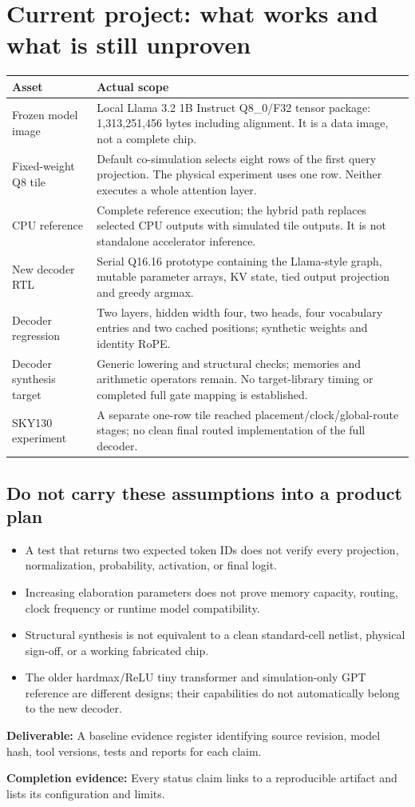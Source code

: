 \documentclass[11pt,a4paper]{article}
\newcommand{\phase}[2]{\clearpage\section{#1}\label{#2}}
\newcommand{\deliver}[2]{\begin{tcolorbox}[colback=pale,colframe=line,boxrule=0.5pt,arc=1mm,left=8pt,right=8pt,top=6pt,bottom=6pt]\textbf{Deliverable:} #1\par\textbf{Completion evidence:} #2\end{tcolorbox}}
\begin{document}
\clearpage
\begingroup
\small
\setlength{\parskip}{0pt}
\tableofcontents
\endgroup

\phase{Current project: what works and what is still unproven}{sec:status}
\begin{tabularx}{\linewidth}{@{}p{42mm}Y@{}}
\toprule\textbf{Asset} & \textbf{Actual scope}\\\midrule
Frozen model image & Local Llama 3.2 1B Instruct Q8\_0/F32 tensor package: 1,313,251,456 bytes including alignment. It is a data image, not a complete chip.\\
Fixed-weight Q8 tile & Default co-simulation selects eight rows of the first query projection. The physical experiment uses one row. Neither executes a whole attention layer.\\
CPU reference & Complete reference execution; the hybrid path replaces selected CPU outputs with simulated tile outputs. It is not standalone accelerator inference.\\
New decoder RTL & Serial Q16.16 prototype containing the Llama-style graph, mutable parameter arrays, KV state, tied output projection and greedy argmax.\\
Decoder regression & Two layers, hidden width four, two heads, four vocabulary entries and two cached positions; synthetic weights and identity RoPE.\\
Decoder synthesis target & Generic lowering and structural checks; memories and arithmetic operators remain. No target-library timing or completed full gate mapping is established.\\
SKY130 experiment & A separate one-row tile reached placement/clock/global-route stages; no clean final routed implementation of the full decoder.\\\bottomrule
\end{tabularx}

\subsection*{Do not carry these assumptions into a product plan}
\begin{itemize}
\item A test that returns two expected token IDs does not verify every projection,
normalization, probability, activation, or final logit.
\item Increasing elaboration parameters does not prove memory capacity, routing,
clock frequency or runtime model compatibility.
\item Structural synthesis is not equivalent to a clean standard-cell netlist,
physical sign-off, or a working fabricated chip.
\item The older hardmax/ReLU tiny transformer and simulation-only GPT reference
are different designs; their capabilities do not automatically belong to the new decoder.
\end{itemize}
\deliver{A baseline evidence register identifying source revision, model hash,
tool versions, tests and reports for each claim.}{Every status claim links to a
reproducible artifact and lists its configuration and limits.}
\end{document}
